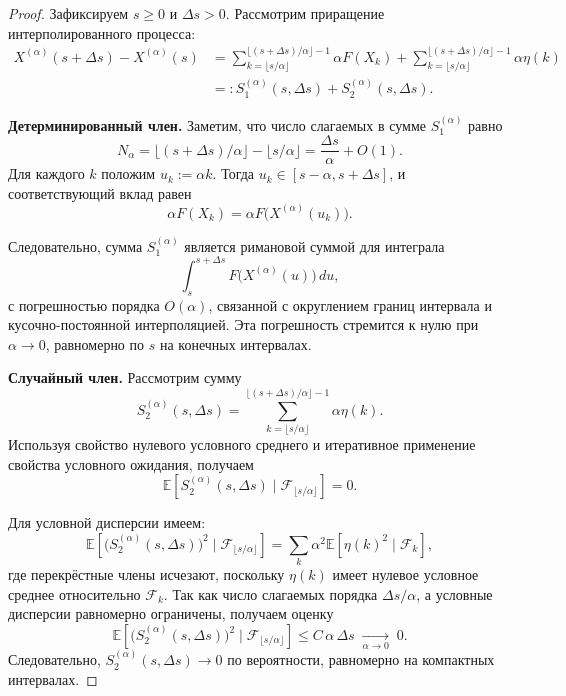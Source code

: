 \documentclass[12pt,a4paper]{article}
\theoremstyle{definition}
\begin{document}
\begin{proof}
Зафиксируем $s\ge0$ и $\Delta s>0$.
Рассмотрим приращение интерполированного процесса:
\begin{align*}
X^{(\alpha)}(s+\Delta s)-X^{(\alpha)}(s)
&=
\sum_{k=\lfloor s/\alpha \rfloor}^{\lfloor (s+\Delta s)/\alpha \rfloor-1}
\alpha F(X_k)
+
\sum_{k=\lfloor s/\alpha \rfloor}^{\lfloor (s+\Delta s)/\alpha \rfloor-1}
\alpha \eta(k) \\
&=: S_1^{(\alpha)}(s,\Delta s) + S_2^{(\alpha)}(s,\Delta s).
\end{align*}

\medskip
\noindent
\textbf{Детерминированный член.}
Заметим, что число слагаемых в сумме $S_1^{(\alpha)}$
равно
\[
N_\alpha
=
\lfloor (s+\Delta s)/\alpha \rfloor-\lfloor s/\alpha \rfloor
=
\frac{\Delta s}{\alpha}+O(1).
\]
Для каждого $k$ положим $u_k:=\alpha k$.
Тогда $u_k\in[s-\alpha,s+\Delta s]$,
и соответствующий вклад равен
\[
\alpha F(X_k)=\alpha F\bigl(X^{(\alpha)}(u_k)\bigr).
\]

Следовательно, сумма $S_1^{(\alpha)}$ является римановой суммой
для интеграла
\[
\int_s^{s+\Delta s} F\bigl(X^{(\alpha)}(u)\bigr)\,du,
\]
с погрешностью порядка $O(\alpha)$,
связанной с округлением границ интервала
и кусочно-постоянной интерполяцией.
Эта погрешность стремится к нулю при $\alpha\to0$,
равномерно по $s$ на конечных интервалах.

\medskip
\noindent
\textbf{Случайный член.}
Рассмотрим сумму
\[
S_2^{(\alpha)}(s,\Delta s)
=
\sum_{k=\lfloor s/\alpha \rfloor}^{\lfloor (s+\Delta s)/\alpha \rfloor-1}
\alpha \eta(k).
\]
Используя свойство нулевого условного среднего
и итеративное применение свойства условного ожидания, получаем
\[
\mathbb E\!\left[S_2^{(\alpha)}(s,\Delta s)\mid \mathcal F_{\lfloor s/\alpha \rfloor}\right]=0.
\]

Для условной дисперсии имеем:
\[
\mathbb E\!\left[\bigl(S_2^{(\alpha)}(s,\Delta s)\bigr)^2
\mid \mathcal F_{\lfloor s/\alpha \rfloor}\right]
=
\sum_k \alpha^2
\mathbb E[\eta(k)^2\mid \mathcal F_k],
\]
где перекрёстные члены исчезают,
поскольку $\eta(k)$ имеет нулевое условное среднее
относительно $\mathcal F_k$.
Так как число слагаемых порядка $\Delta s/\alpha$,
а условные дисперсии равномерно ограничены,
получаем оценку
\[
\mathbb E\!\left[\bigl(S_2^{(\alpha)}(s,\Delta s)\bigr)^2
\mid \mathcal F_{\lfloor s/\alpha \rfloor}\right]
\le
C\,\alpha\,\Delta s
\;\xrightarrow[\alpha\to0]{}\;0.
\]
Следовательно, $S_2^{(\alpha)}(s,\Delta s)\to0$
по вероятности, равномерно на компактных интервалах.


\end{proof}
\end{document}
